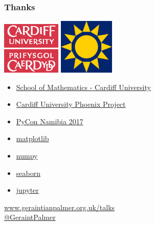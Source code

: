 \documentclass{beamer}
\begin{document}
\begin{frame}
\frametitle{Thanks}
\begin{center}
\includegraphics[width=0.21\textwidth]{cflogo}
\hspace{10mm}
\includegraphics[width=0.2\textwidth]{napycon_logo}
\begin{itemize}
\item \href{http://www.cardiff.ac.uk/mathematics}{School of Mathematics - Cardiff University}
\item \href{http://www.cardiff.ac.uk/about/our-profile/our-values/engagement/transforming-communities/the-phoenix-project}{Cardiff University Phoenix Project}
\item \href{https://na.pycon.org/}{PyCon Namibia 2017}
\item \href{http://matplotlib.org/}{matplotlib}
\item \href{http://www.numpy.org/}{numpy}
\item \href{http://seaborn.pydata.org/}{seaborn}
\item \href{http://jupyter.org/}{jupyter}
\end{itemize}
\url{www.geraintianpalmer.org.uk/talks}\\
\href{https://twitter.com/GeraintPalmer}{@GeraintPalmer}
\end{center}
\end{frame}
\end{document}
